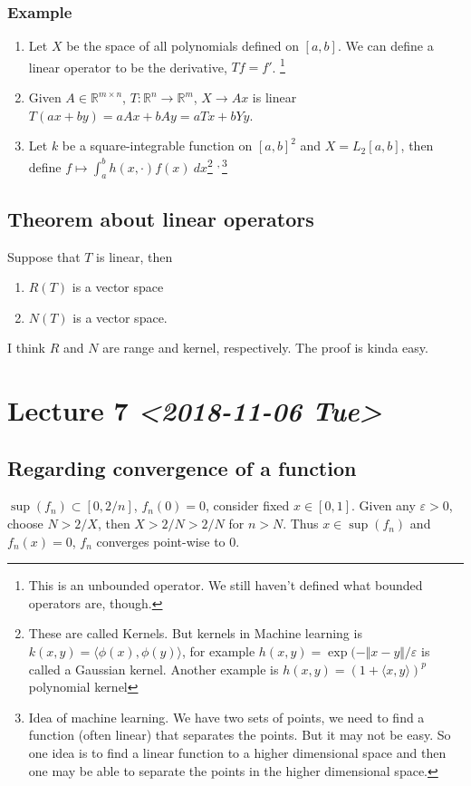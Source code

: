 \documentclass[11pt]{article}
\def\R{\mathbb{R}}
\begin{document}
\subsubsection{Example}
\label{sec:org4e99ad7}
\begin{enumerate}
\item Let \(X\) be the space of all polynomials defined on \([a, b]\). We can define a
linear operator to be the derivative, \(Tf = f'\). \footnote{This is an unbounded operator. We still haven't defined what bounded
operators are, though.}
\item Given \(A \in \R^{m\times n}\), \(T \colon \R^n \rightarrow \R^m\), \(X
       \rightarrow Ax\) is linear \(T(ax + by) = aAx + bAy = aTx + bYy\).
\item Let \(k\) be a square-integrable function on \([a, b]^2\) and \(X=L_2[a, b]\),
then define \(f\mapsto\int_{a}^{b} h(x, \cdot) f(x)\ dx\)\footnote{These are called Kernels. But kernels in Machine learning is \(k(x, y)
=\langle \phi(x), \phi(y)\rangle\), for example \(h(x, y) = \exp(-\Vert x -
y\Vert/\varepsilon\) is called a Gaussian kernel. Another example is \(h(x, y) =
(1+\langle x, y\rangle)^p\) polynomial kernel} \textsuperscript{,}\,\footnote{Idea of machine learning. We have two sets of points, we need to find a
function (often linear) that separates the points. But it may not be easy. So
one idea is to find a linear function to a higher dimensional space and then one
may be able to separate the points in the higher dimensional space.}
\end{enumerate}
\subsection{Theorem about linear operators}
\label{sec:orgeaef860}
Suppose that \(T\) is linear, then
\begin{enumerate}
\item \(R(T)\) is a vector space
\item \(N(T)\) is a vector space.
\end{enumerate}

I think \(R\) and \(N\) are range and kernel, respectively. The proof is kinda
easy.
\section{Lecture 7 \textit{<2018-11-06 Tue>}}
\label{sec:org464c733}
\subsection{Regarding convergence of a function}
\label{sec:org0d014d4}
\(\sup(f_n)\subset [0, 2/n]\), \(f_n(0) = 0\), consider fixed \(x\in [0, 1]\).
Given any \(\varepsilon > 0\), choose \(N > 2/X\), then \(X > 2/N > 2/N\) for
\(n>N\). Thus \(x \in \sup(f_n)\) and \(f_n(x) = 0\), \(f_n\) converges point-wise to
\(0\).
\end{document}
